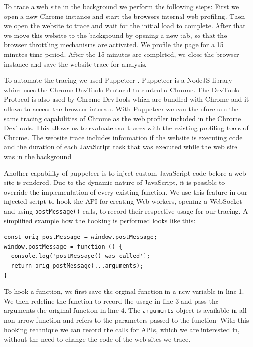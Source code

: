 \documentclass[
	ruledheaders=section,%
	class=report,%
	thesis={type=bachelor},%
	accentcolor=9c,%
	custommargins=true,%
	marginpar=false,%
	parskip=half-,%
	fontsize=11pt,%
]{tudapub}
\begin{document}
  To trace a web site in the background we perform the following steps: First we open a new Chrome instance and start the browsers internal web profiling. Then we open the website to trace and wait for the initial load to complete. After that we move this website to the background by opening a new tab, so that the browser throttling mechanisms are activated. We profile the page for a 15 minutes time period. After the 15 minutes are completed, we close the browser instance and save the website trace for analysis.
    
  To automate the tracing we used Puppeteer \cite{pptr}. Puppeteer is a NodeJS library which uses the Chrome DevTools Protocol \cite{chrome-devtools-protocol} to control a Chrome. The DevTools Protocol is also used by Chrome DevTools which are bundled with Chrome and it allows to access the browser interals. With Puppeteer we can therefore use the same tracing capabilities of Chrome as the web profiler included in the Chrome DevTools. This allows us to evaluate our traces with the existing profiling tools of Chrome. The website trace includes information if the website is executing code and the duration of each JavaScript task that was executed while the web site was in the background.

  Another capability of puppeteer is to inject custom JavaScript code before a web site is rendered. Due to the dynamic nature of JavaScript, it is possible to override the implementation of every existing function. We use this feature in our injected script to hook the API for creating Web workers, opening a WebSocket and using \texttt{postMessage()} calls, to record their respective usage for our tracing. A simplified example how the hooking is performed looks like this:

\begin{lstlisting}
const orig_postMessage = window.postMessage;
window.postMessage = function () {
  console.log('postMessage() was called');
  return orig_postMessage(...arguments);
}
\end{lstlisting}

  To hook a function, we first save the orginal function in a new variable in line 1. We then redefine the function to record the usage in line 3 and pass the arguments the original function in line 4. The \texttt{arguments} object is available in all non-arrow function and refers to the parameters passed to the function. With this hooking technique we can record the calls for APIs, which we are interested in, without the need to change the code of the web sites we trace.
\end{document}
